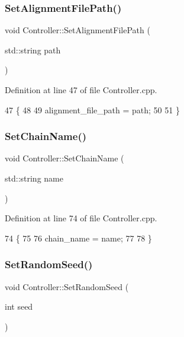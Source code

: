 \subsubsection{\texorpdfstring{Set\+Alignment\+File\+Path()}{SetAlignmentFilePath()}}
{\footnotesize\ttfamily void Controller\+::\+Set\+Alignment\+File\+Path (\begin{DoxyParamCaption}\item[{std\+::string}]{path }\end{DoxyParamCaption})}



Definition at line 47 of file Controller.\+cpp.


\begin{DoxyCode}
47                                                     \{
48   
49   alignment\_file\_path = path;
50   
51 \}
\end{DoxyCode}
\mbox{\label{classController_aa122ac902c36eeb2889e12558d4ad087}} 
\subsubsection{\texorpdfstring{Set\+Chain\+Name()}{SetChainName()}}
{\footnotesize\ttfamily void Controller\+::\+Set\+Chain\+Name (\begin{DoxyParamCaption}\item[{std\+::string}]{name }\end{DoxyParamCaption})}



Definition at line 74 of file Controller.\+cpp.


\begin{DoxyCode}
74                                             \{
75   
76   chain\_name = name;
77   
78 \}
\end{DoxyCode}
\mbox{\label{classController_a1438b54d76df7239f361bd93dfbf9246}} 
\subsubsection{\texorpdfstring{Set\+Random\+Seed()}{SetRandomSeed()}}
{\footnotesize\ttfamily void Controller\+::\+Set\+Random\+Seed (\begin{DoxyParamCaption}\item[{int}]{seed }\end{DoxyParamCaption})}



